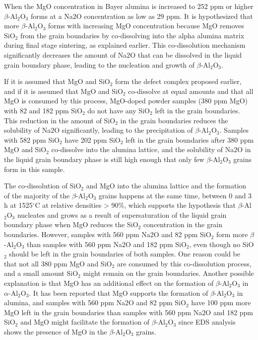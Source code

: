 When the MgO concentration in Bayer alumina is increased to 252 ppm or higher $\beta$-Al$_{2}$O$_{3}$ forms at a Na${2}$O concentration as low as 29 ppm. It is hypothesized that more $\beta$-Al$_{2}$O$_{3}$ forms with increasing MgO concentration because MgO removes SiO$_{2}$ from the grain boundaries by co-dissolving into the alpha alumina matrix during final stage sintering, as explained earlier. This co-dissolution mechanism significantly decreases the amount of Na${2}$O that can be dissolved in the liquid grain boundary phase, leading to the nucleation and growth of $\beta$-Al$_{2}$O$_{3}$. 

If it is assumed that MgO and SiO$_{2}$ form the defect complex proposed earlier, and if it is assumed that MgO and SiO$_{2}$ co-dissolve at equal amounts and that all MgO is consumed by this process, MgO-doped powder samples (380 ppm MgO) with 82 and 182 ppm SiO$_{2}$ do not have any SiO$_{2}$ left in the grain boundaries. This reduction in the amount of SiO$_{2}$ in the grain boundaries reduces the solubility of Na${2}$O significantly, leading to the precipitation of $\beta$-Al$_{2}$O$_{3}$. Samples with 582 ppm SiO$_{2}$ have 202 ppm SiO$_{2}$ left in the grain boundaries after 380 ppm MgO and SiO$_{2}$ co-dissolve into the alumina lattice, and the solubility of Na${2}$O in the liquid grain boundary phase is still high enough that only few $\beta$-Al$_{2}$O$_{3}$ grains form in this sample. 

The co-dissolution of SiO$_{2}$ and MgO into the alumina lattice and the formation of the majority of the $\beta$-Al$_{2}$O$_{3}$ grains happens at the same time, between 0 and 3 h at 1525$^{\circ}$C at relative densities > 90\%, which supports the hypothesis that $\beta$-Al$_{2}$O$_{3}$ nucleates and grows as a result of supersaturation of the liquid grain boundary phase when MgO reduces the SiO$_{2}$ concentration in the grain boundaries. However, samples with 560 ppm Na${2}$O and 82 ppm SiO$_{2}$ form more $\beta$-Al$_{2}$O$_{3}$ than samples with 560 ppm Na${2}$O and 182 ppm SiO$_{2}$, even though no SiO$_{2}$ should be left in the grain boundaries of both samples. One reason could be that not all 380 ppm MgO and SiO$_{2}$ are consumed by this co-dissolution process, and a small amount SiO$_{2}$ might remain on the grain boundaries. Another possible explanation is that MgO has an additional effect on the formation of $\beta$-Al$_{2}$O$_{3}$ in $\alpha$-Al$_{2}$O$_{3}$. It has been reported that MgO supports the formation of $\beta$-Al$_{2}$O$_{3}$ in alumina, and samples with 560 ppm Na${2}$O and 82 ppm SiO$_{2}$ have 100 ppm more MgO left in the grain boundaries than samples with 560 ppm Na${2}$O and 182 ppm SiO$_{2}$ and MgO might facilitate the formation of $\beta$-Al$_{2}$O$_{3}$ since EDS analysis shows the presence of MgO in the $\beta$-Al$_{2}$O$_{3}$ grains. 


